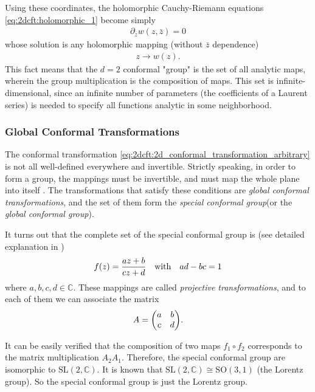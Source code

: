\documentclass[10pt]{article}
\begin{document}
Using these coordinates, the holomorphic Cauchy-Riemann equations \cref{eq:2dcft:holomorphic_1} become simply
\begin{align}
    \partial_{\bar{z}}w(z,\bar{z})=0
\end{align}
whose solution is any holomorphic mapping (without $\bar{z}$ dependence)
\begin{align}
    z\to w(z).\label{eq:2dcft:2d_conformal_transformation_arbitrary}
\end{align}
This fact means that the $d=2$ conformal "group" is the set of all analytic maps, wherein the group multiplication is the composition of maps.
This set is infinite-dimensional, since an infinite number of parameters (the coefficients of a Laurent series) is needed to specify all functions analytic in some neighborhood.
\subsubsection{Global Conformal Transformations}
\begin{intu}
    The conformal transformation \cref{eq:2dcft:2d_conformal_transformation_arbitrary} is not all well-defined everywhere and invertible.
    Strictly speaking, in order to form a group, the mappings must be invertible, and must map the whole plane into itself \snm.
    The transformations that satisfy these conditions are \textit{global conformal transformations}, and the set of them form the \textit{special conformal group}\snm (or the \textit{global conformal group}).
\end{intu}
It turns out that the complete set of the special conformal group is (see detailed explanation in \cite{DiFrancesco:1997nk,Qualls:2015qjb})
\begin{align}
    f(z)=\frac{az+b}{cz+d}\qq{with}ad-bc=1
\end{align}
where $a,b,c,d\in\mathbb{C}$.
These mappings are called \textit{projective transformations}, and to each of them we can associate the matrix
\begin{align}
    A=\mqty(a & b \\c&d).
\end{align}
\begin{remark}
    It can be easily verified that the composition of two maps $f_1\circ f_2$ corresponds to the matrix multiplication $A_2 A_1$.
    Therefore, the special conformal group are isomorphic to $\mathrm{SL}(2,\mathbb{C})$.
    It is known that $\mathrm{SL}(2,\mathbb{C})\cong \mathrm{SO}(3,1)$ (the Lorentz group).
    So the special conformal group is just the Lorentz group.
\end{remark}
\end{document}
